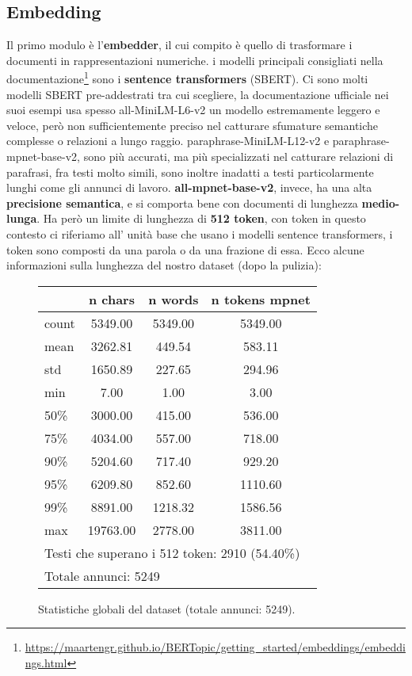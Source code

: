 \subsection{Embedding}
Il primo modulo è l'\textbf{embedder}, il cui compito è quello di trasformare i documenti in rappresentazioni numeriche.
i modelli principali consigliati nella documentazione\footnote{\url{https://maartengr.github.io/BERTopic/getting_started/embeddings/embeddings.html}} sono i \textbf{sentence transformers} (SBERT).
Ci sono molti modelli SBERT pre-addestrati tra cui scegliere, la documentazione ufficiale nei suoi esempi usa spesso all-MiniLM-L6-v2 un modello estremamente leggero e veloce, però non sufficientemente preciso nel catturare sfumature semantiche complesse o relazioni a lungo raggio.
paraphrase-MiniLM-L12-v2 e paraphrase-mpnet-base-v2, sono più accurati, ma più specializzati nel catturare relazioni di parafrasi, fra testi molto simili, sono inoltre inadatti a testi particolarmente lunghi come gli annunci di lavoro.
\textbf{all-mpnet-base-v2}, invece, ha una alta \textbf{precisione semantica}, e si comporta bene con documenti di lunghezza \textbf{medio-lunga}.
Ha però un limite di lunghezza di \textbf{512 token}, con token in questo contesto ci riferiamo all' unità base che usano i modelli sentence transformers, i token sono composti da una parola o da una frazione di essa.
Ecco alcune informazioni sulla lunghezza del nostro dataset (dopo la pulizia):
\begin{figure}[H]
\centering
\scriptsize
\begin{tabular}{lccc}
\hline
 & n chars & n words & n tokens mpnet \\
\hline
count & 5349.00 & 5349.00 & 5349.00 \\
mean & 3262.81 & 449.54 & 583.11 \\
std & 1650.89 & 227.65 & 294.96 \\
min & 7.00 & 1.00 & 3.00 \\
50\% & 3000.00 & 415.00 & 536.00 \\
75\% & 4034.00 & 557.00 & 718.00 \\
90\% & 5204.60 & 717.40 & 929.20 \\
95\% & 6209.80 & 852.60 & 1110.60 \\
99\% & 8891.00 & 1218.32 & 1586.56 \\
max & 19763.00 & 2778.00 & 3811.00 \\
\hline
\multicolumn{4}{l}{Testi che superano i 512 token: 2910 (54.40\%)} \\
\multicolumn{4}{l}{Totale annunci: 5249} \\
\hline
\end{tabular}
\caption{Statistiche globali del dataset (totale annunci: 5249).}
\label{fig:dataset-stats}
\end{figure}
